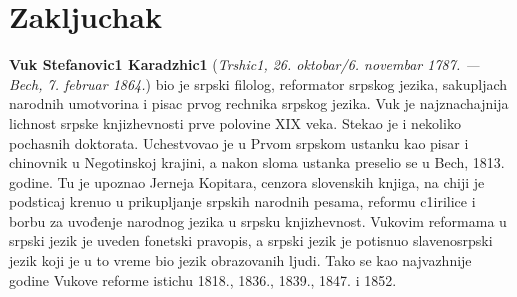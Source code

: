 \documentclass[12pt,oneside]{memoir}
\begin{document}

\pangrami

\pangrami

\chapter{Zakljuchak}
\pangrami

\pangrami

\literatura

\backmatter

\begin{biografija}
  \textbf{Vuk Stefanovic1 Karadzhic1} (\emph{Trshic1,
    26. oktobar/6. novembar 1787. — Bech, 7. februar 1864.}) bio je
  srpski filolog, reformator srpskog jezika, sakupljach narodnih
  umotvorina i pisac prvog rechnika srpskog jezika.  Vuk je
  najznachajnija lichnost srpske knjizhevnosti prve polovine XIX
  veka. Stekao je i nekoliko pochasnih doktorata.  Uchestvovao je u
  Prvom srpskom ustanku kao pisar i chinovnik u Negotinskoj krajini, a
  nakon sloma ustanka preselio se u Bech, 1813. godine. Tu je upoznao
  Jerneja Kopitara, cenzora slovenskih knjiga, na chiji je podsticaj
  krenuo u prikupljanje srpskih narodnih pesama, reformu c1irilice i
  borbu za uvođenje narodnog jezika u srpsku knjizhevnost. Vukovim
  reformama u srpski jezik je uveden fonetski pravopis, a srpski jezik
  je potisnuo slavenosrpski jezik koji je u to vreme bio jezik
  obrazovanih ljudi. Tako se kao najvazhnije godine Vukove reforme
  istichu 1818., 1836., 1839., 1847. i 1852.
\end{biografija}





\end{document}
